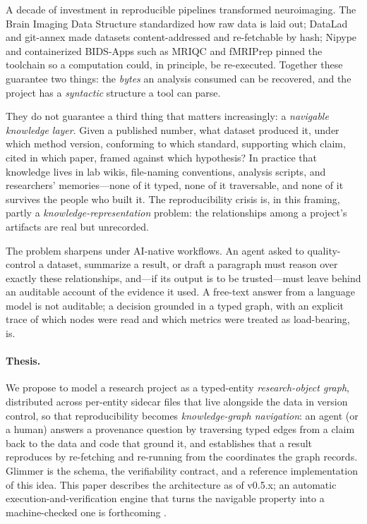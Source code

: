 \documentclass[preprint]{glimmer-paper}
\begin{document}
A decade of investment in reproducible pipelines transformed neuroimaging. The Brain
Imaging Data Structure \citep{gorgolewski2016bids} standardized how raw data is laid out;
DataLad and git-annex \citep{halchenko2021datalad} made datasets content-addressed and
re-fetchable by hash; Nipype \citep{gorgolewski2011nipype} and containerized BIDS-Apps
such as MRIQC \citep{esteban2017mriqc} and fMRIPrep \citep{esteban2019fmriprep} pinned the
toolchain so a computation could, in principle, be re-executed. Together these guarantee
two things: the \emph{bytes} an analysis consumed can be recovered, and the project has a
\emph{syntactic} structure a tool can parse.

They do not guarantee a third thing that matters increasingly: a \emph{navigable knowledge
layer}. Given a published number, what dataset produced it, under which method version,
conforming to which standard, supporting which claim, cited in which paper, framed against
which hypothesis? In practice that knowledge lives in lab wikis, file-naming conventions,
analysis scripts, and researchers' memories---none of it typed, none of it traversable,
and none of it survives the people who built it. The reproducibility crisis is, in this
framing, partly a \emph{knowledge-representation} problem: the relationships among a
project's artifacts are real but unrecorded.

The problem sharpens under AI-native workflows. An agent asked to quality-control a
dataset, summarize a result, or draft a paragraph must reason over exactly these
relationships, and---if its output is to be trusted---must leave behind an auditable
account of the evidence it used. A free-text answer from a language model is not
auditable; a decision grounded in a typed graph, with an explicit trace of which nodes
were read and which metrics were treated as load-bearing, is.

\paragraph{Thesis.} We propose to model a research project as a typed-entity
\emph{research-object graph}, distributed across per-entity sidecar files that live
alongside the data in version control, so that reproducibility becomes
\emph{knowledge-graph navigation}: an agent (or a human) answers a provenance question by
traversing typed edges from a claim back to the data and code that ground it, and
establishes that a result reproduces by re-fetching and re-running from the coordinates
the graph records. Glimmer is the schema, the verifiability contract, and a reference
implementation of this idea. This paper describes the architecture as of v0.5.x; an
automatic execution-and-verification engine that turns the navigable property into a
machine-checked one is forthcoming \citep{eldamaty2026proactive}.
\end{document}
